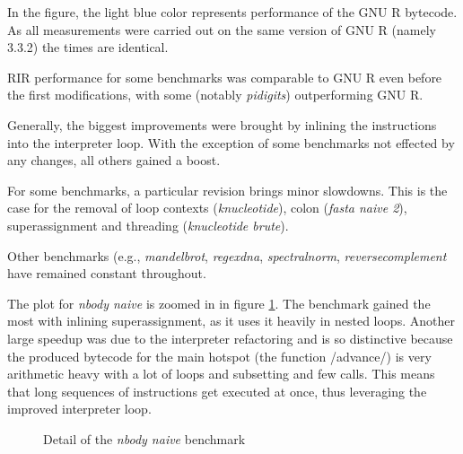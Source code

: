 In the figure, the light blue color represents performance of the GNU R bytecode. As all measurements were carried out on the same version of GNU R (namely 3.3.2) the times are identical.

RIR performance for some benchmarks was comparable to GNU R even before the first modifications, with some (notably \emph{pidigits}) outperforming GNU R.

Generally, the biggest improvements were brought by inlining the instructions into the interpreter loop. With the exception of some benchmarks not effected by any changes, all others gained a boost.

For some benchmarks, a particular revision brings minor slowdowns. This is the case for the removal of loop contexts (\emph{knucleotide}), colon (\emph{fasta naive 2}), superassignment and threading (\emph{knucleotide brute}).

Other benchmarks (e.g., \emph{mandelbrot}, \emph{regexdna}, \emph{spectralnorm}, \emph{reversecomplement} have remained constant throughout.

The plot for \emph{nbody naive} is zoomed in in figure \ref{fig:nbody}. The benchmark gained the most with inlining superassignment, as it uses it heavily in nested loops. Another large speedup was due to the interpreter refactoring and is so distinctive because the produced bytecode for the main hotspot (the function \rinline/advance/) is very arithmetic heavy with a lot of loops and subsetting and few calls. This means that long sequences of instructions get executed at once, thus leveraging the improved interpreter loop.

\begin{figure}[htbp]
  \caption{\label{fig:nbody}Detail of the \emph{nbody naive} benchmark}
  \centering
\end{figure}

